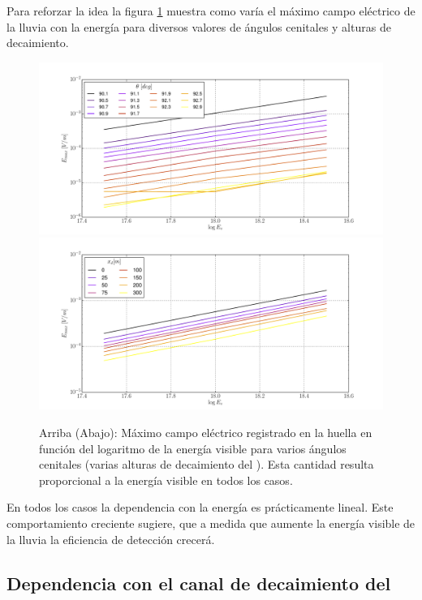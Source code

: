 	Para reforzar la idea la figura \ref{fig:ev_dependence2} muestra como var\'ia el m\'aximo campo el\'ectrico de la lluvia con la energ\'ia para diversos valores de \'angulos cenitales y alturas de decaimiento.
	\begin{figure}[ht!]
		\centering
		\includegraphics[width=\textwidth]{./fig/simulacionRadio/maxDep/eMaxThEv.pdf}
		\includegraphics[width=\textwidth]{./fig/simulacionRadio/maxDep/eMaxXdEv.pdf}
		\caption{\label{fig:ev_dependence2}
		Arriba (Abajo): M\'aximo campo el\'ectrico registrado en la huella en funci\'on del logaritmo de la energ\'ia visible para varios \'angulos cenitales (varias alturas de decaimiento del \tauon{}).
		Esta cantidad resulta proporcional a la energ\'ia visible en todos los casos.
		}
	\end{figure}
	En todos los casos la dependencia con la energ\'ia es pr\'acticamente lineal.
	Este comportamiento creciente sugiere, que a medida que aumente la energ\'ia visible de la lluvia la eficiencia de detecci\'on crecer\'a.
	
	
	\subsection{Dependencia con el canal de decaimiento del \tauon{}}
	\label{sbsc:decayChRadio}
	
